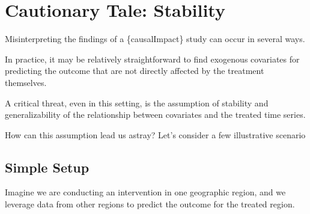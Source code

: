 \documentclass[
  letterpaper,
  DIV=11,
  numbers=noendperiod]{scrreprt}
\begin{document}
\section{Cautionary Tale: Stability}\label{cautionary-tale-stability}

Misinterpreting the findings of a \{causalImpact\} study can occur in
several ways.

In practice, it may be relatively straightforward to find exogenous
covariates for predicting the outcome that are not directly affected by
the treatment themselves.

A critical threat, even in this setting, is the assumption of stability
and generalizability of the relationship between covariates and the
treated time series.

How can this assumption lead us astray? Let's consider a few
illustrative scenario

\subsection{Simple Setup}\label{simple-setup}

Imagine we are conducting an intervention in one geographic region, and
we leverage data from other regions to predict the outcome for the
treated region.
\end{document}
